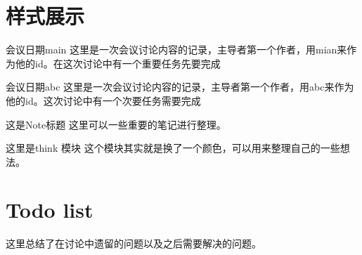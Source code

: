 \documentclass{project-log}
\begin{document}
\MakeFrontPage%
\setcounter{page}{1}%
\newpage
%
\newpage
\section{样式展示}
\setcounter{page}{1}%
\begin{Meeting}{会议日期}{main}%
这里是一次会议讨论内容的记录，主导者第一个作者，用mian来作为他的id。在这次讨论中有一个重要任务先要完成
\end{Meeting}

\begin{Meeting}{会议日期}{abc}%
这里是一次会议讨论内容的记录，主导者第一个作者，用abc来作为他的id。这次讨论中有一个次要任务需要完成
\end{Meeting}

\begin{Note}{这是Note标题}
这里可以一些重要的笔记进行整理。
\end{Note}


\begin{Think}{这里是think 模块}
这个模块其实就是换了一个颜色，可以用来整理自己的一些想法。
\end{Think}




\newpage
\appendix

\section{Todo list}
\begin{Note}{}
\centering 这里总结了在讨论中遗留的问题以及之后需要解决的问题。
\end{Note}

\AddListOfTodos
\newpage

\end{document}
